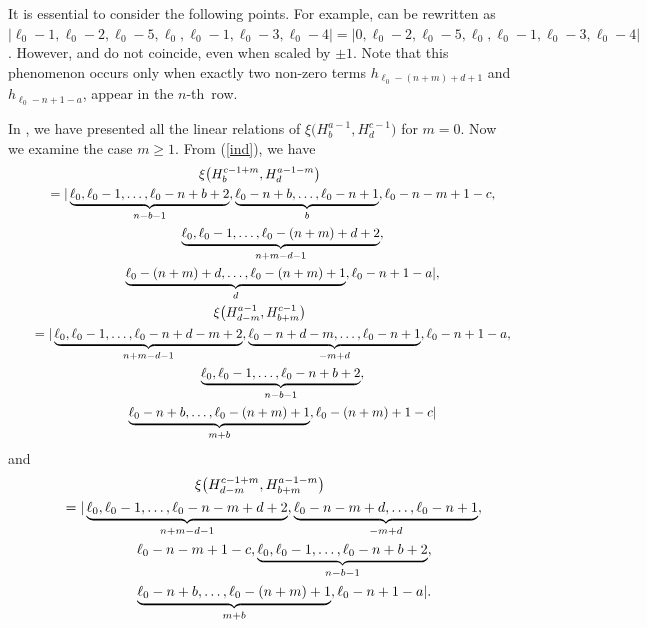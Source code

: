 \documentclass[pdftex]{sigma}
\numberwithin{equation}{section}
\begin{document}
It is essential to consider the following points. For example,  can be rewritten as $ |\ell_{0}-1,\ell_{0}-2,\ell_{0}-5,\ell_{0},\ell_{0}-1,\ell_{0}-3,\ell_{0}-4|=|0,\ell_{0}-2,\ell_0-5,\ell_{0},\ell_{0}-1,\ell_{0}-3,\ell_{0}-4|$. However,  and  do not coincide, even when scaled by $\pm 1$. Note that this phenomenon occurs only when exactly two non-zero terms $h_{\ell_{0}-(n+m)+d+1}$ and $h_{\ell_{0}-n+1-a}$, appear in the $n$-th~row. %

In \cite{asy3}, we have presented all the linear relations of $\xi\bigl(H^{a-1}_{b},H^{c-1}_{d}\bigr)$ for $m=0$. Now we examine the case $m\geq1$. From (\ref{ind}), we have
\begin{gather}
\xi\bigl(H^{c-1+m}_{b},H^{a-1-m}_{d}\bigr)\nonumber\\
\qquad=|\underbrace{\ell_{0},\ell_{0}-1,\dots,\ell_{0}-n+b+2}_{n-b-1},
\underbrace{\ell_{0}-n+b,\dots,\ell_{0}-n+1}_{b},\ell_{0}-n-m+1-c,\nonumber\\
\qquad\hphantom{=|}{} \underbrace{\ell_{0},\ell_{0}-1,\dots,\ell_{0}-(n+m)+d+2}_{n+m-d-1},\nonumber\\
\qquad\hphantom{=|}{} \underbrace{\ell_{0}-(n+m)+d,\dots,\ell_{0}-(n+m)+1}_{d},\ell_{0}-n+1-a|,\label{ind1}
\\
\xi\bigl(H^{a-1}_{d-m},H^{c-1}_{b+m}\bigr)\nonumber\\
\qquad=|\underbrace{\ell_{0},\ell_{0}-1,\dots,\ell_{0}-n+d-m+2}_{n+m-d-1},
\underbrace{\ell_{0}-n+d-m,\dots,\ell_{0}-n+1}_{-m+d},\ell_{0}-n+1-a,\nonumber\\
\hphantom{\qquad=|}{} \underbrace{\ell_{0},\ell_{0}-1,\dots,\ell_{0}-n+b+2}_{n-b-1},\nonumber\\
\hphantom{\qquad=|}{} \underbrace{\ell_{0}-n+b,\dots,\ell_{0}-(n+m)+1}_{m+b},\ell_{0}-(n+m)+1-c|\label{ind2}
\end{gather}
and
\begin{gather}
\xi\bigl(H^{c-1+m}_{d-m},H^{a-1-m}_{b+m}\bigr)\nonumber\\
\qquad=|\underbrace{\ell_{0},\ell_{0}-1,\dots,\ell_{0}-n-m+d+2}_{n+m-d-1},
\underbrace{\ell_{0}-n-m+d,\dots,\ell_{0}-n+1}_{-m+d},\nonumber\\
\qquad\hphantom{=|}{}\, \ell_{0}-n-m+1-c,\underbrace{\ell_{0},\ell_{0}-1,\dots,\ell_{0}-n+b+2}_{n-b-1},\nonumber\\
\qquad\hphantom{=|}{} \underbrace{\ell_{0}-n+b,\dots,\ell_{0}-(n+m)+1}_{m+b},\ell_{0}-n+1-a|.\label{ind3}
\end{gather}
\end{document}
